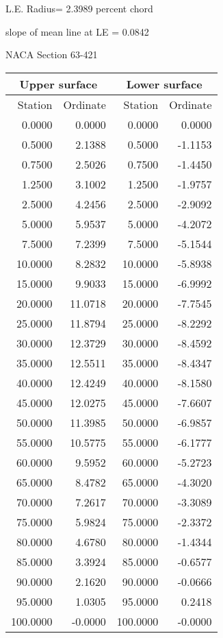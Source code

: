 \documentclass[11pt]{book}
\begin{document}
L.E. Radius=  2.3989 percent chord


 slope of mean line at LE =  0.0842
 \newpage
  \label{s63-421}
 \begin{Large}
 NACA Section 63-421
 \end{Large}
  
 \vspace{8mm}
 \begin{tabular}{|r|r|r|r|} \hline 
 \multicolumn{2}{|c|}{Upper surface} & \multicolumn{2}{|c|}{Lower surface} \\
 \hline
 Station & Ordinate & Station & Ordinate \\
 \hline
0.0000 & 0.0000 & 0.0000 & 0.0000 \\
0.5000 & 2.1388 & 0.5000 & -1.1153 \\
0.7500 & 2.5026 & 0.7500 & -1.4450 \\
1.2500 & 3.1002 & 1.2500 & -1.9757 \\
2.5000 & 4.2456 & 2.5000 & -2.9092 \\
5.0000 & 5.9537 & 5.0000 & -4.2072 \\
7.5000 & 7.2399 & 7.5000 & -5.1544 \\
10.0000 & 8.2832 & 10.0000 & -5.8938 \\
15.0000 & 9.9033 & 15.0000 & -6.9992 \\
20.0000 & 11.0718 & 20.0000 & -7.7545 \\
25.0000 & 11.8794 & 25.0000 & -8.2292 \\
30.0000 & 12.3729 & 30.0000 & -8.4592 \\
35.0000 & 12.5511 & 35.0000 & -8.4347 \\
40.0000 & 12.4249 & 40.0000 & -8.1580 \\
45.0000 & 12.0275 & 45.0000 & -7.6607 \\
50.0000 & 11.3985 & 50.0000 & -6.9857 \\
55.0000 & 10.5775 & 55.0000 & -6.1777 \\
60.0000 & 9.5952 & 60.0000 & -5.2723 \\
65.0000 & 8.4782 & 65.0000 & -4.3020 \\
70.0000 & 7.2617 & 70.0000 & -3.3089 \\
75.0000 & 5.9824 & 75.0000 & -2.3372 \\
80.0000 & 4.6780 & 80.0000 & -1.4344 \\
85.0000 & 3.3924 & 85.0000 & -0.6577 \\
90.0000 & 2.1620 & 90.0000 & -0.0666 \\
95.0000 & 1.0305 & 95.0000 & 0.2418 \\
100.0000 & -0.0000 & 100.0000 & -0.0000 \\
 \hline 
 \end{tabular}
\end{document}
